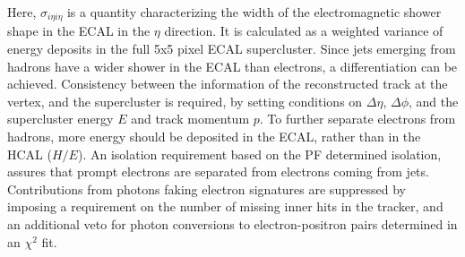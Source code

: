 Here, $\sigma_{i\eta i\eta}$ is a quantity characterizing the width of the electromagnetic shower shape in the ECAL in the $\eta$ direction. It is calculated as a weighted variance of energy deposits in the full 5x5 pixel ECAL supercluster. Since jets emerging from hadrons have a wider shower in the ECAL than electrons, a differentiation can be achieved. Consistency between the information of the reconstructed track at the vertex, and the supercluster is required, by setting conditions on $\Delta\eta$, $\Delta\phi$, and the supercluster energy $E$ and track momentum $p$. To further separate electrons from hadrons, more energy should be deposited in the ECAL, rather than in the HCAL ($H/E$). An isolation requirement based on the PF determined isolation, assures that prompt electrons are separated from electrons coming from \eg jets. Contributions from photons faking electron signatures are suppressed by imposing a requirement on the number of missing inner hits in the tracker, and an additional veto for photon conversions to electron-positron pairs determined in an $\chi^2$ fit.

